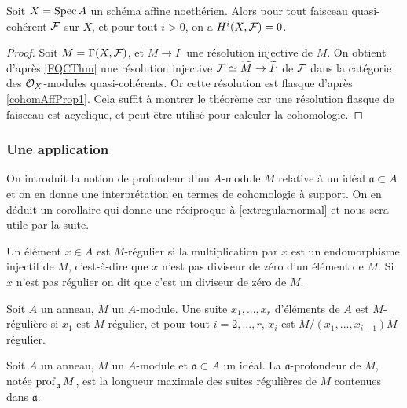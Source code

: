 \begin{thm}\label{cohomoaffine}
Soit $X=\operatorname{Spec} A$ un schéma affine noethérien. Alors pour tout faisceau quasi-cohérent $\mathcal{F}$ sur $X$, et pour tout $i>0$, on a $H^i(X,\mathcal{F})=0$. 
\end{thm}
\begin{proof}
Soit $M=\Gamma(X,\mathcal{F})$, et $M\rightarrow I^.$ une résolution injective de $M$. On obtient d'après \ref{FQCThm} une résolution injective $\mathcal{F}\simeq \widetilde{M}\rightarrow \widetilde{I}^.$ de $\mathcal{F}$ dans la catégorie des $\mathcal{O}_X$-modules quasi-cohérents. Or cette résolution est flasque d'après \ref{cohomAffProp1}. Cela suffit à montrer le théorème car une résolution flasque de faisceau est acyclique, et peut être utilisé pour calculer la cohomologie.
\end{proof}

\subsubsection{Une application}

On introduit la notion de profondeur d'un $A$-module $M$ relative à un idéal $\mathfrak{a}\subset A$ et on en donne une interprétation en termes de cohomologie à support. On en déduit un corollaire qui donne une réciproque à \ref{extregularnormal} et nous sera utile par la suite.

\begin{defn}
Un élément $x\in A$ est $M$-régulier si la multiplication par $x$ est un endomorphisme injectif de $M$, c'est-à-dire que $x$ n'est pas diviseur de zéro d'un élément de $M$. Si $x$ n'est pas régulier on dit que c'est un diviseur de zéro de $M$.
\end{defn}

\begin{defn}
Soit $A$ un anneau, $M$ un $A$-module. Une suite $x_1,...,x_r$ d'éléments de $A$ est $M$-régulière si $x_1$ est $M$-régulier, et pour tout $i=2,...,r$, $x_i$ est $M/(x_1,...,x_{i-1})M$-régulier.
\end{defn}

\begin{defn}[Profondeur]
Soit $A$ un anneau, $M$ un $A$-module et $\mathfrak{a}\subset A$ un idéal. La $\mathfrak{a}$-profondeur de $M$, notée $\operatorname{prof}_\mathfrak{a} M$, est la longueur maximale des suites régulières de $M$ contenues dans $\mathfrak{a}$.
\end{defn}

